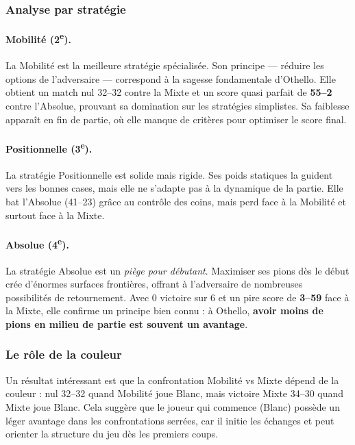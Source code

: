 \documentclass[12pt, a4paper]{article}
\begin{document}
\subsubsection{Analyse par stratégie}

\paragraph{Mobilité (2\textsuperscript{e}).}
La Mobilité est la meilleure stratégie spécialisée. Son principe --- réduire les options de l'adversaire --- correspond à la sagesse fondamentale d'Othello. Elle obtient un match nul 32--32 contre la Mixte et un score quasi parfait de \textbf{55--2} contre l'Absolue, prouvant sa domination sur les stratégies simplistes. Sa faiblesse apparaît en fin de partie, où elle manque de critères pour optimiser le score final.

\paragraph{Positionnelle (3\textsuperscript{e}).}
La stratégie Positionnelle est solide mais rigide. Ses poids statiques la guident vers les bonnes cases, mais elle ne s'adapte pas à la dynamique de la partie. Elle bat l'Absolue (41--23) grâce au contrôle des coins, mais perd face à la Mobilité et surtout face à la Mixte.

\paragraph{Absolue (4\textsuperscript{e}).}
La stratégie Absolue est un \textit{piège pour débutant}. Maximiser ses pions dès le début crée d'énormes surfaces frontières, offrant à l'adversaire de nombreuses possibilités de retournement. Avec 0 victoire sur 6 et un pire score de \textbf{3--59} face à la Mixte, elle confirme un principe bien connu : à Othello, \textbf{avoir moins de pions en milieu de partie est souvent un avantage}.

\subsubsection{Le rôle de la couleur}

Un résultat intéressant est que la confrontation Mobilité vs Mixte dépend de la couleur : nul 32--32 quand Mobilité joue Blanc, mais victoire Mixte 34--30 quand Mixte joue Blanc. Cela suggère que le joueur qui commence (Blanc) possède un léger avantage dans les confrontations serrées, car il initie les échanges et peut orienter la structure du jeu dès les premiers coups.
\end{document}
